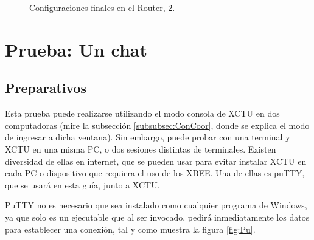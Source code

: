 \begin{figure}[H] %
\caption[1]{Configuraciones finales en el Router, 2.}
\label{fig:RAd}
\end{figure}

\newpage

\section{Prueba: Un chat}
\subsection{Preparativos}
Esta prueba puede realizarse utilizando el modo consola de XCTU en dos computadoras (mire la subsección \ref{subsubsec:ConCoor}, donde se explica el modo de ingresar a dicha ventana). Sin embargo, puede probar con una terminal y XCTU en una misma PC, o dos sesiones distintas de terminales. Existen diversidad de ellas en internet, que se pueden usar para evitar instalar XCTU en cada PC o dispositivo que requiera el uso de los XBEE. Una de ellas es puTTY\footnotemark, que se usará en esta guía, junto a XCTU.


PuTTY no es necesario que sea instalado como cualquier programa de Windows, ya que solo es un ejecutable que al ser invocado, pedirá inmediatamente los datos para establecer una conexión, tal y como muestra la figura \ref{fig:Pu}.

